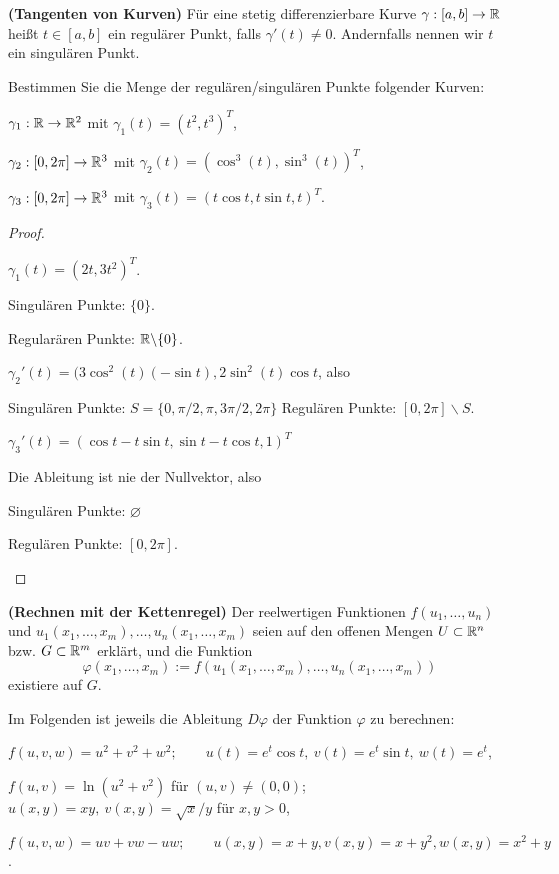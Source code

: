\begin{Problem}
	\textbf{(Tangenten von Kurven)} Für eine stetig differenzierbare Kurve $\gamma:[a,b]\to \mathbb{R}$ heißt $t\in [a,b]$ ein regulärer Punkt, falls $\gamma'(t)\neq 0$. Andernfalls nennen wir $t$ ein singulären Punkt.

Bestimmen Sie die Menge der regulären/singulären Punkte folgender Kurven:	
\begin{parts}
\item $\gamma_1:\mathbb{R}\to \mathbb{R}^2$ mit $\gamma_1(t)=(t^2,t^3)^T$,
\item $\gamma_2:[0,2\pi]\to \mathbb{R}^3$ mit $\gamma_2(t)=(\cos^3(t),\sin^3(t))^T$,
\item $\gamma_3:[0,2\pi]\to \mathbb{R}^3$ mit $\gamma_3(t)=(t\cos t,t\sin t, t)^T$.
\end{parts}
\end{Problem}
\begin{proof}
	\begin{parts}
	\item $\gamma_1(t)=(2t,3t^2)^T$.

		Singulären Punkte: $\{0\} $.
		
		Regularären Punkte: $\mathbb{R}\backslash \{0\} $.
	\item $\gamma_2'(t)=(3\cos^2(t)(-\sin t), 2\sin^2(t)\cos t$, also

		Singulären Punkte: $S=\{0,\pi / 2, \pi, 3\pi / 2, 2\pi\} $
		Regulären Punkte: $[0,2\pi] \backslash S$.
	\item  $\gamma_3'(t)=(\cos t-t\sin t,\sin t-t\cos t,1)^T$

		Die Ableitung ist nie der Nullvektor, also

		Singulären Punkte: $\varnothing$ 

		Regulären Punkte: $[0,2\pi]$.\qedhere
	\end{parts}
\end{proof}
\begin{Problem}
	\textbf{(Rechnen mit der Kettenregel)} Der reelwertigen Funktionen $f(u_1,\dots, u_n)$ und $u_1(x_1,\dots, x_m),\dots, u_n(x_1,\dots, x_m)$ seien auf den offenen Mengen $U\subset \mathbb{R}^n$ bzw. $G\subset \mathbb{R}^m$ erklärt, und die Funktion
	\[
	\varphi(x_1,\dots, x_m):=f(u_1(x_1,\dots, x_m),\dots, u_n(x_1,\dots, x_m))
\]
existiere auf $G$.

Im Folgenden ist jeweils die Ableitung $D\varphi$ der Funktion $\varphi$ zu berechnen:
\begin{parts}
\item $f(u,v,w)=u^2+v^2+w^2;\qquad u(t)=e^t\cos t,~v(t)=e^t\sin t,~w(t)=e^t$,
\item $f(u,v)=\ln(u^2+v^2)$ f\"{u}r $(u,v)\neq (0,0)$; $u(x,y)=xy,~v(x,y)=\sqrt{x} / y$ f\"{u}r $x,y>0$,
\item $f(u,v,w)=uv+vw-uw;\qquad u(x,y)=x+y,v(x,y)=x+y^2,w(x,y)=x^2+y$.
\end{parts}
\end{Problem}
